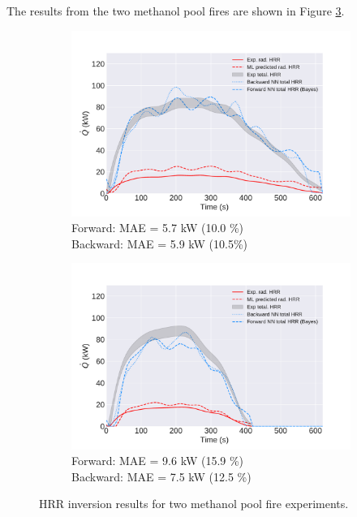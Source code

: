 \documentclass{article}
\begin{document}
The results from the two methanol pool fires are shown in Figure \ref{fig:meth_fires}.

\begin{figure}[htbp]
  \centering
  \begin{subfigure}[t]{.45\textwidth}
      \centering
      \includegraphics[width=\textwidth,keepaspectratio]{figures/meth_22in_1_final.pdf}
      \caption{ Forward: MAE = 5.7 kW (10.0 \%) \\ Backward: MAE = 5.9 kW (10.5\%)}
      \label{fig:meth_22in_1}
  \end{subfigure}
  \begin{subfigure}[t]{.45\textwidth}
      \centering
      \includegraphics[width=\textwidth ,keepaspectratio]{figures/meth_22in_2_final.pdf}
      \caption{  Forward: MAE = 9.6 kW (15.9 \%) \\ Backward: MAE = 7.5 kW (12.5 \%)}
      \label{fig:meth_22in_2}
  \end{subfigure}
  \caption{HRR inversion results for two methanol pool fire experiments.} 
  \label{fig:meth_fires}
\end{figure}
\clearpage
\end{document}
